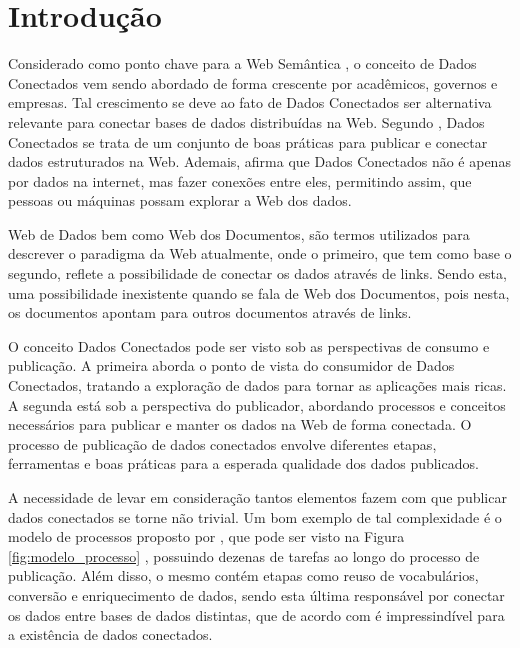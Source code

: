 \chapter{Introdução}
\label{cap:introducao}
Considerado como ponto chave para a Web Semântica \cite{berners2001semantic}, o conceito de Dados Conectados vem sendo abordado de forma crescente por acadêmicos, governos e empresas. Tal crescimento se deve ao fato de Dados Conectados ser alternativa relevante para conectar bases de dados distribuídas na Web. Segundo , Dados Conectados se trata de um conjunto de boas práticas para publicar e conectar dados estruturados na Web. Ademais,  afirma que Dados Conectados não é apenas por dados na internet, mas fazer conexões entre eles, permitindo assim, que pessoas ou máquinas possam explorar a Web dos dados.

Web de Dados bem como Web dos Documentos, são termos utilizados para descrever o paradigma da Web atualmente, onde o primeiro, que tem como base o segundo, reflete a possibilidade de conectar os dados através de links. Sendo esta, uma possibilidade inexistente quando se fala de Web dos Documentos, pois nesta, os documentos apontam para outros documentos através de links. 

O conceito Dados Conectados pode ser visto sob as perspectivas de consumo e publicação. A primeira aborda o ponto de vista do consumidor de Dados Conectados, tratando a exploração de dados para tornar as aplicações mais ricas. A segunda está sob a perspectiva do publicador, abordando processos \cite{bizer2007publish, hyland2011joy, villazon2011methodological, Avila2015} e conceitos \cite{berners2006linked, wood2014linked} necessários para publicar e manter os dados na Web de forma conectada. O processo de publicação de dados conectados envolve diferentes etapas, ferramentas e boas práticas \cite{world2014best} para a esperada qualidade dos dados publicados. 

A necessidade de levar em consideração tantos elementos fazem com que publicar dados conectados se torne não trivial. Um bom exemplo de tal complexidade é o modelo de processos proposto por , que pode ser visto na Figura \ref{fig:modelo_processo} , possuindo dezenas de tarefas ao longo do processo de publicação. Além disso, o mesmo contém etapas como reuso de vocabulários, conversão  e enriquecimento de dados, sendo esta última responsável por conectar os dados entre bases de dados distintas, que de acordo com  é impressindível para a existência de dados conectados.

